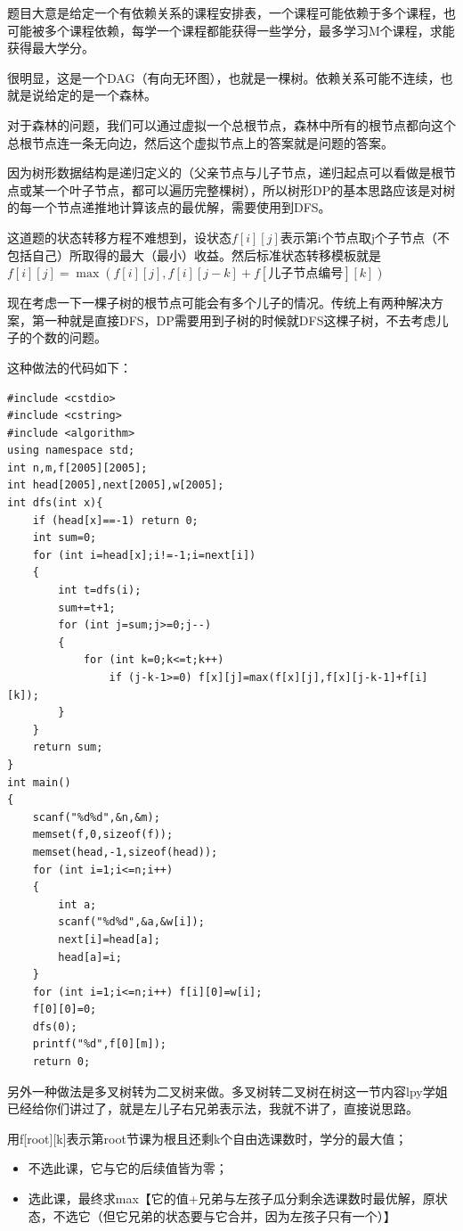 \documentclass{article}
\theoremstyle{nonumberplain}
\begin{document}
题目大意是给定一个有依赖关系的课程安排表，一个课程可能依赖于多个课程，也可能被多个课程依赖，每学一个课程都能获得一些学分，最多学习M个课程，求能获得最大学分。

很明显，这是一个DAG（有向无环图），也就是一棵树。依赖关系可能不连续，也就是说给定的是一个森林。

对于森林的问题，我们可以通过虚拟一个总根节点，森林中所有的根节点都向这个总根节点连一条无向边，然后这个虚拟节点上的答案就是问题的答案。

因为树形数据结构是递归定义的（父亲节点与儿子节点，递归起点可以看做是根节点或某一个叶子节点，都可以遍历完整棵树），所以树形DP的基本思路应该是对树的每一个节点递推地计算该点的最优解，需要使用到DFS。

这道题的状态转移方程不难想到，设状态$f[i][j]$表示第i个节点取j个子节点（不包括自己）所取得的最大（最小）收益。然后标准状态转移模板就是$f[i][j]=\max(f[i][j],f[i][j-k]+f[儿子节点编号][k])$

现在考虑一下一棵子树的根节点可能会有多个儿子的情况。传统上有两种解决方案，第一种就是直接DFS，DP需要用到子树的时候就DFS这棵子树，不去考虑儿子的个数的问题。

这种做法的代码如下：
\begin{verbatim}
#include <cstdio>
#include <cstring>
#include <algorithm>
using namespace std;
int n,m,f[2005][2005];
int head[2005],next[2005],w[2005];
int dfs(int x){
    if (head[x]==-1) return 0;
    int sum=0;
    for (int i=head[x];i!=-1;i=next[i])
    {
        int t=dfs(i);
        sum+=t+1;
        for (int j=sum;j>=0;j--)
        {
            for (int k=0;k<=t;k++)
                if (j-k-1>=0) f[x][j]=max(f[x][j],f[x][j-k-1]+f[i][k]);
        }
    }
    return sum;
}
int main()
{
    scanf("%d%d",&n,&m);
    memset(f,0,sizeof(f));
    memset(head,-1,sizeof(head));
    for (int i=1;i<=n;i++)
    {
        int a;
        scanf("%d%d",&a,&w[i]);
        next[i]=head[a];
        head[a]=i;
    }
    for (int i=1;i<=n;i++) f[i][0]=w[i];
    f[0][0]=0;
    dfs(0);
    printf("%d",f[0][m]);
    return 0;
\end{verbatim}

另外一种做法是多叉树转为二叉树来做。多叉树转二叉树在树这一节内容lpy学姐已经给你们讲过了，就是左儿子右兄弟表示法，我就不讲了，直接说思路。

用f[root][k]表示第root节课为根且还剩k个自由选课数时，学分的最大值；
\begin{itemize}
	\item{不选此课，它与它的后续值皆为零；}
	\item{选此课，最终求max【它的值+兄弟与左孩子瓜分剩余选课数时最优解，原状态，不选它（但它兄弟的状态要与它合并，因为左孩子只有一个）】}
\end{itemize}
\end{document}
